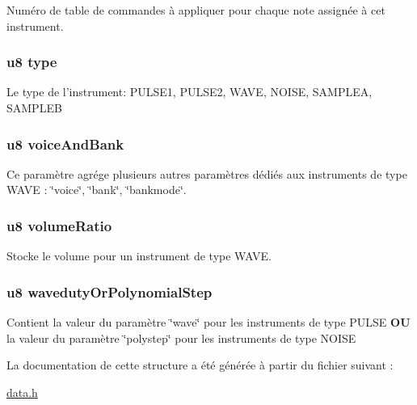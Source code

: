 \label{struct_i_n_s_t_r_u_m_e_n_t_a5a6e736101953ab6b0f9cfc7e7f40a59}
Numéro de table de commandes à appliquer pour chaque note assignée à cet instrument. \hypertarget{struct_i_n_s_t_r_u_m_e_n_t_a34923af2855ec28604554d526eb97c33}{
\subsubsection[{type}]{\setlength{\rightskip}{0pt plus 5cm}u8 {\bf type}}}
\label{struct_i_n_s_t_r_u_m_e_n_t_a34923af2855ec28604554d526eb97c33}
Le type de l'instrument: PULSE1, PULSE2, WAVE, NOISE, SAMPLEA, SAMPLEB \hypertarget{struct_i_n_s_t_r_u_m_e_n_t_a6126b24ce345ae666412f07d5528d164}{
\subsubsection[{voiceAndBank}]{\setlength{\rightskip}{0pt plus 5cm}u8 {\bf voiceAndBank}}}
\label{struct_i_n_s_t_r_u_m_e_n_t_a6126b24ce345ae666412f07d5528d164}
Ce paramètre agrége plusieurs autres paramètres dédiés aux instruments de type WAVE : \char`\"{}voice\char`\"{}, \char`\"{}bank\char`\"{}, \char`\"{}bankmode\char`\"{}. \hypertarget{struct_i_n_s_t_r_u_m_e_n_t_a1338e4097c1cb451ef7d5a9b7d3c54d7}{
\subsubsection[{volumeRatio}]{\setlength{\rightskip}{0pt plus 5cm}u8 {\bf volumeRatio}}}
\label{struct_i_n_s_t_r_u_m_e_n_t_a1338e4097c1cb451ef7d5a9b7d3c54d7}
Stocke le volume pour un instrument de type WAVE. \hypertarget{struct_i_n_s_t_r_u_m_e_n_t_a54aabf48ce8e591830868fe225157dee}{
\subsubsection[{wavedutyOrPolynomialStep}]{\setlength{\rightskip}{0pt plus 5cm}u8 {\bf wavedutyOrPolynomialStep}}}
\label{struct_i_n_s_t_r_u_m_e_n_t_a54aabf48ce8e591830868fe225157dee}
Contient la valeur du paramètre \char`\"{}wave\char`\"{} pour les instruments de type PULSE {\bfseries OU} la valeur du paramètre \char`\"{}polystep\char`\"{} pour les instruments de type NOISE 

La documentation de cette structure a été générée à partir du fichier suivant :\begin{DoxyCompactItemize}
\item 
\hyperlink{data_8h}{data.h}\end{DoxyCompactItemize}
